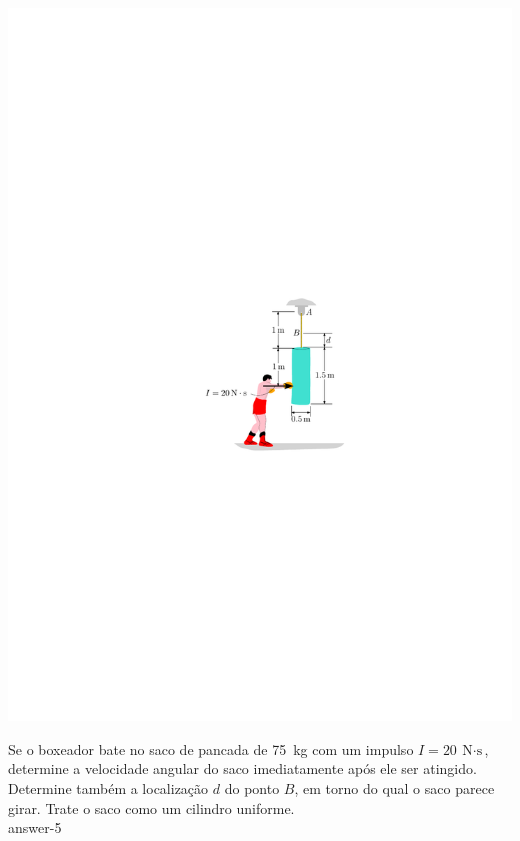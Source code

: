 \begin{minipage}{.5\linewidth}
	\begin{flushleft}
		\includegraphics[scale=1.2]{../../images/draw_3}
	\end{flushleft}

\end{minipage}
\begin{minipage}{.5\linewidth}
	\vspace{-1cm}
	\item Se o boxeador bate no saco de pancada de \SI{75}{\kilogram} com um impulso $I= \SI{20}{\newton\cdot\second}$, determine a velocidade angular do saco imediatamente após ele ser atingido. Determine também a localização $d$ do ponto $B$, em torno do qual o saco parece girar. Trate o saco como um cilindro uniforme.\\
	
	{answer-5}
\end{minipage}
